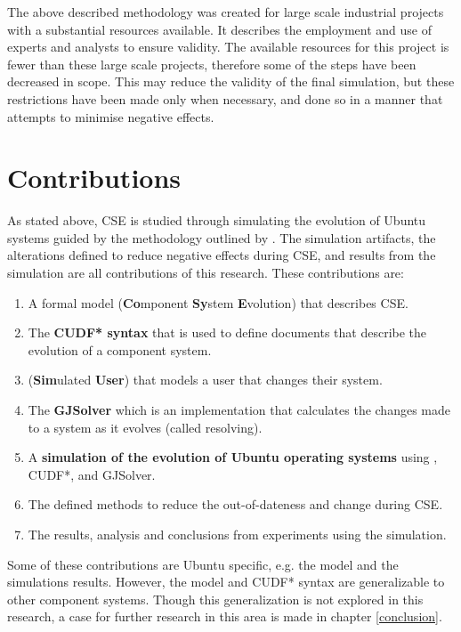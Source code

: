 The above described methodology was created for large scale industrial projects with a substantial resources available.
It describes the employment and use of experts and analysts to ensure validity.
The available resources for this project is fewer than these large scale projects, therefore some of the steps have been decreased in scope.
This may reduce the validity of the final simulation, but these restrictions have been made only when necessary,
and done so in a manner that attempts to minimise negative effects.

\section{Contributions}
As stated above, CSE is studied through simulating the evolution of Ubuntu systems guided by the methodology outlined by \cite{Law2005}.
The simulation artifacts, the alterations defined to reduce negative effects during CSE, 
and results from the simulation are all contributions of this research. 
These contributions are:
\begin{enumerate}
  \item A formal model \textbf{\modelname} (\textbf{Co}mponent \textbf{Sy}stem \textbf{E}volution) that describes CSE. 
  \item The \textbf{CUDF* syntax} that is used to define documents that describe the evolution of a component system.
  \item \textbf{\usermodel} (\textbf{Sim}ulated \textbf{User}) that models a user that changes their system.
  \item The \textbf{GJSolver} which is an implementation that calculates the changes made to a system as it evolves (called resolving).
  \item A \textbf{simulation of the evolution of Ubuntu operating systems} using \modelname, CUDF*, \usermodel and GJSolver.
  \item The defined methods to reduce the out-of-dateness and change during CSE. 
  \item The results, analysis and conclusions from experiments using the simulation.
\end{enumerate}

Some of these contributions are Ubuntu specific, e.g. the \usermodel model and the simulations results.
However, the \modelname model and CUDF* syntax are generalizable to other component systems.
Though this generalization is not explored in this research, a case for further research in this area is made in chapter \ref{conclusion}.

